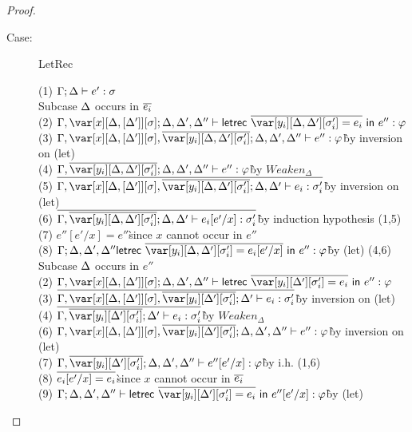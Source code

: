 \begin{proof}
\begin{description}
\item[Case:] LetRec
\begin{tabbing}
    (1) $\Gamma; \Delta \vdash e' : \sigma$\\
    Subcase $\Delta$ occurs in $\overline{e_i}$\\
    (2) $\G,\xD; \D, \D', \D'' \vdash \lletrec{\ov{\var[y_i][\D,\D'][\s_i'] = e_i}}{e''} : \vp$\\
    (3) $\G,\xD,\ov{\var[y_i][\D,\D'][\s'_i]}; \D,\D',\D'' \vdash e'' : \vp$\` by inversion on (let)\\
    (4) $\G,\ov{\var[y_i][\D,\D'][\s'_i]}; \D,\D',\D'' \vdash e'' : \vp$\` by $Weaken_\Delta$\\
    (5) $\ov{\G,\xD,\ov{\var[y_i][\D,\D'][\s'_i]}; \D, \D' \vdash e_i : \s'_i}$\` by inversion on (let)\\
    (6) $\ov{\G,\ov{\var[y_i][\D,\D'][\s'_i]}; \D,\D' \vdash e_i[e'/x] : \s'_i}$\` by induction hypothesis (1,5)\\
    (7) $e''[e'/x] = e''$\` since $x$ cannot occur in $e''$\\
    (8) $\G; \D,\D',\D'' \lletrec{\ov{\var[y_i][\D,\D'][\s_i'] = e_i[e'/x]}}{e''} : \vp$\` by (let) (4,6)\\
    Subcase $\Delta$ occurs in $e''$\\
    (2) $\G, \xD; \D, \D', \D'' \vdash \lletrec{\ov{\var[y_i][\D'][\s_i'] = e_i}}{e''} : \vp$\\
    (3) $\ov{\G,\xD,\ov{\var[y_i][\D'][\s'_i]}; \D' \vdash e_i : \s'_i}$\` by inversion on (let)\\
    (4) $\ov{\G,\ov{\var[y_i][\D'][\s'_i]}; \D' \vdash e_i : \s'_i}$\` by $Weaken_\Delta$\\
    (6) $\G,\xD,\ov{\var[y_i][\D'][\s'_i]}; \D,\D',\D'' \vdash e'' : \vp$\` by inversion on (let)\\
    (7) $\G,\ov{\var[y_i][\D'][\s'_i]}; \D,\D',\D'' \vdash e''[e'/x] : \vp$\` by i.h. (1,6)\\
    (8) $\overline{e_i[e'/x] = e_i}$\` since $x$ cannot occur in $\overline{e_i}$\\
    (9) $\G;\D,\D',\D'' \vdash \lletrec{\ov{\var[y_i][\D'][\s'_i] = e_i}}{e''[e'/x]} : \vp$\` by (let)\\
\end{tabbing}


\end{description}
\end{proof}

